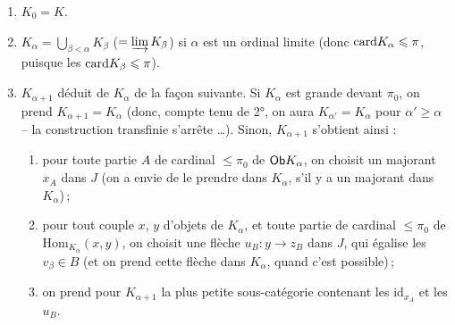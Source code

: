 \begin{enumerate}
\item[1°)] $K_0 = K$.
\item[2°)] $K_{\alpha} = \bigcup_{\beta < \alpha} K_{\beta}$ ($= \varinjlim K_{\beta}$) si $\alpha$ est un ordinal limite (donc $\mathrm{card} K_{\alpha} \leqslant \pi$, puisque les $\mathrm{card} K_{\beta} \leqslant \pi$).
\item[3°)] $K_{\alpha+1}$ déduit de $K_{\alpha}$ de la façon suivante. Si $K_{\alpha}$ est grande devant $\pi_0$, on prend $K_{\alpha+1} = K_{\alpha}$ (donc, compte tenu de 2°, on aura $K_{\alpha'} = K_{\alpha}$ pour $\alpha' \geqslant \alpha$ -- la construction transfinie s’arrête \ldots). Sinon, $K_{\alpha+1}$ s’obtient ainsi :
\begin{enumerate}
\item[a)] pour toute partie $A$ de cardinal $\leqslant \pi_0$ de $\mathsf{Ob} K_{\alpha}$, on choisit un majorant $x_A$ dans $J$ (on a envie de le prendre dans $K_{\alpha}$, s’il y a un majorant dans $K_{\alpha}$)\,;
\item[b)] pour tout couple $x$, $y$ d’objets de $K_{\alpha}$, et toute partie de cardinal $\leqslant \pi_0$ de $\mathrm{Hom}_{K_{\alpha}}(x,y)$, on choisit une flèche $u_B : y \longrightarrow z_B$ dans $J$, qui égalise les $v_{\beta} \in B$ (et on prend cette flèche dans $K_{\alpha}$, quand c’est possible)\,;
\item[c)] on prend pour $K_{\alpha+1}$ la plus petite sous-catégorie contenant les $\mathrm{id}_{x_A}$ et les $u_B$.
\end{enumerate}
\end{enumerate}

